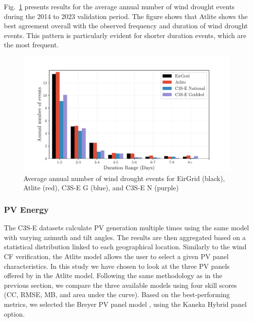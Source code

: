 \documentclass[a4paper, 11pt]{article}
\begin{document}
Fig.~\ref{fig:bar_number_events_verification_wind} presents results for the average annual number of wind drought events during the 2014 to 2023 validation period. The figure shows that Atlite shows the best agreement overall with the observed frequency and duration of wind drought events. This pattern is particularly evident for shorter duration events, which are the most frequent.

\begin{figure}[!ht]
	\centering
	\includegraphics[width=\textwidth]{verification_wind_bar}
	\caption{Average annual number of wind drought events for EirGrid (black), Atlite (red), C3S-E G (blue), and C3S-E N (purple)}
	\label{fig:bar_number_events_verification_wind}
\end{figure}

\newpage
\subsubsection{PV Energy}
\label{sec:pv_verification}

The C3S-E datasets calculate PV generation multiple times using the same model with varying azimuth and tilt angles. The results are then aggregated based on a statistical distribution linked to each geographical location. Similarly to the wind CF verification, the Atlite model allows the user to select a given PV panel characteristics. In this study we have chosen to look at the three PV panels offered by in the Atlite model. Following the same methodology as in the previous section, we compare the three available models using four skill scores (CC, RMSE, MB, and area under the curve). Based on the best-performing metrics, we selected the Breyer PV panel model \cite{beyer2004pv}, using the Kaneka Hybrid panel option.
\end{document}
